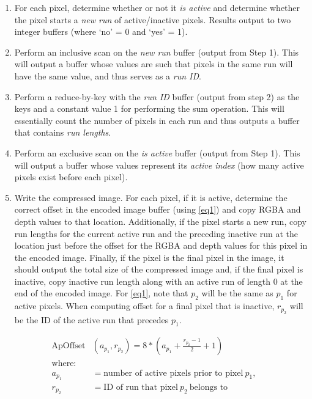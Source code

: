 \documentclass{vgtc}                          %
\begin{document}
\begin{enumerate}
  \item For each pixel, determine whether or not it \textit{is active} and determine whether the pixel starts a \textit{new run} of active/inactive pixels. Results output to two integer buffers (where `no' = 0 and `yes' = 1).
  \item Perform an inclusive scan on the \textit{new run} buffer (output from Step 1). This will output a buffer whose values are such that pixels in the same run will have the same value, and thus serves as a \textit{run ID}.
  \item Perform a reduce-by-key with the \textit{run ID} buffer (output from step 2) as the keys and a constant value 1 for performing the sum operation. This will essentially count the number of pixels in each run and thus outputs a buffer that contains \textit{run lengths}.
  \item Perform an exclusive scan on the \textit{is active} buffer (output from Step 1). This will output a buffer whose values represent its \textit{active index} (how many active pixels exist before each pixel).
  \item Write the compressed image. For each pixel, if it is active, determine the correct offset in the encoded image buffer (using \autoref{eq1}) and copy RGBA and depth values to that location. Additionally, if the pixel starts a new run, copy run lengths for the current active run and the preceding inactive run at the location just before the offset for the RGBA and depth values for this pixel in the encoded image. Finally, if the pixel is the final pixel in the image, it should output the total size of the compressed image and, if the final pixel is inactive, copy inactive run length along with an active run of length $0$ at the end of the encoded image. For \autoref{eq1}, note that $p_2$ will be the same as $p_1$ for active pixels. When computing offset for a final pixel that is inactive, $r_{p_2}$ will be the ID of the active run that precedes $p_1$.
\end{enumerate}

\begin{align}
  \text{ApOffset}&(a_{p_1}, r_{p_2}) = 8 * \left(a_{p_1} + \frac{r_{p_2} - 1}{2} + 1\right) \label{eq1} \\
  \text{where:} \nonumber \\
  a_{p_1} &= \text{number of active pixels prior to pixel}~p_1, \nonumber \\
  r_{p_2} &= \text{ID of run that pixel}~p_2~\text{belongs to} \nonumber
\end{align}
\end{document}

